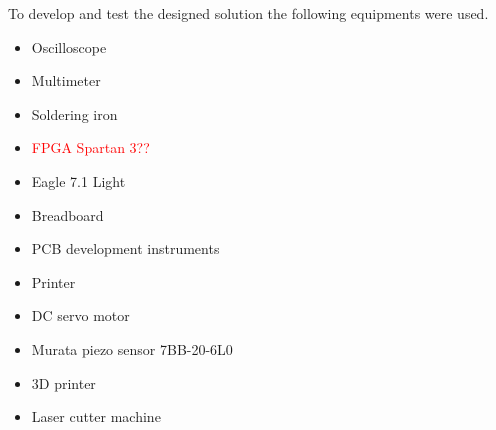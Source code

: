To develop and test the designed solution the following equipments were used.
\begin{itemize}
	\item Oscilloscope
	\item Multimeter
	\item Soldering iron
	\item \textcolor{red}{FPGA Spartan 3??}
	\item Eagle 7.1 Light
	\item Breadboard
	\item PCB development instruments
	\item Printer
	\item DC servo motor
	\item Murata piezo sensor 7BB-20-6L0
	\item 3D printer
	\item Laser cutter machine
\end{itemize}